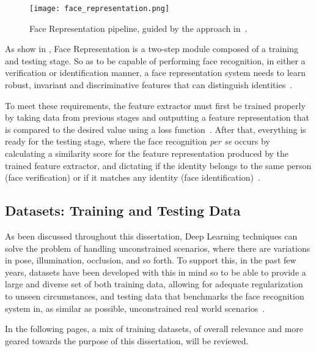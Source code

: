 \documentclass[class=report, crop=false, a4paper, 12pt]{standalone}
\begin{document}
\begin{figure}[H]
    \centering
    \texttt{[image: face\_representation.png]}
    \caption[Pipeline]{Face Representation pipeline, guided by the approach in~\autocite{wangDeepFaceRecognition2021}.}
    \label{fig:frep pipeline}
\end{figure}

\par As show in , Face Representation is a two-step module composed of a training and testing stage. So as to be capable of performing face recognition, in either a verification or identification manner, a face representation system needs to learn robust, invariant and discriminative features that can distinguish identities~\autocite{ranjanDeepLearningUnderstanding2018}. 
\par To meet these requirements, the feature extractor must first be trained properly by taking data from previous stages and outputting a feature representation that is compared to the desired value using a loss function~\autocite{lecunDeepLearning2015, wangDeepFaceRecognition2021}. After that, everything is ready for the testing stage, where the face recognition \textit{per se} occurs by calculating a similarity score for the feature representation produced by the trained feature extractor, and dictating if the identity belongs to the same person (face verification) or if it matches any identity (face identification)~\autocite{ranjanDeepLearningUnderstanding2018}.



\subsection{Datasets: Training and Testing Data}
\par As been discussed throughout this dissertation, Deep Learning techniques can solve the problem of handling unconstrained scenarios, where there are variations in pose, illumination, occlusion, and so forth. To support this, in the past few years, datasets have been developed with this in mind so to be able to provide a large and diverse set of both training data, allowing for adequate regularization to unseen circumstances, and testing data that benchmarks the face recognition system in, as similar as possible, unconstrained real world scenarios~\autocite{duElementsEndtoendDeep2022}. 

\vspace{\baselineskip}
In the following pages, a mix of training datasets, of overall relevance and more geared towards the purpose of this dissertation, will be reviewed.
\end{document}
